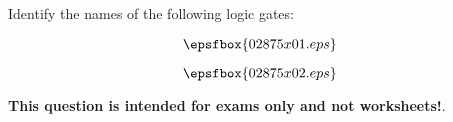

Identify the names of the following logic gates:

$$\epsfbox{02875x01.eps}$$







$$\epsfbox{02875x02.eps}$$







{\bf This question is intended for exams only and not worksheets!}.




